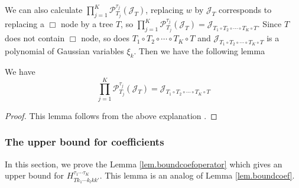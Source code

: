 We can also calculate $\prod_{j=1}^K\mathcal{P}^{\tau_j}_{T_j}(\mathcal{J}_{T})$, replacing $w$ by $\mathcal{J}_{T}$ corresponds to replacing a $\Box$ node by a tree $T$, so $\prod_{j=1}^K\mathcal{P}^{\tau_j}_{T_j}(\mathcal{J}_{T})=\mathcal{J}_{T_1\circ T_2\circ \cdots\circ T_K\circ T}$. Since $T$ does not contain $\Box$ node, so does $T_1\circ T_2\circ \cdots\circ T_K\circ T$ and $\mathcal{J}_{T_1\circ T_2\circ \cdots\circ T_K\circ T}$ is a polynomial of Gaussian variables $\xi_k$. Then we have the following lemma
\begin{lem}
We have 
\begin{equation}\label{eq.operatoreqsimpleJ_T.threewave}
    \prod_{j=1}^K\mathcal{P}^{\tau_j}_{T_j}(\mathcal{J}_{T})=\mathcal{J}_{T_1\circ T_2\circ \cdots\circ T_K\circ T}
\end{equation}
\end{lem}
\begin{proof}
This lemma follows from the above explanation .
\end{proof}



\subsubsection{The upper bound for coefficients} In this section, we prove the Lemma \ref{lem.boundcoefoperator} which gives an upper bound for $H^{\tau_1\cdots \tau_{K}}_{Tk_1\cdots k_{l}kk'}$. This lemma is an analog of Lemma \ref{lem.boundcoef}.

